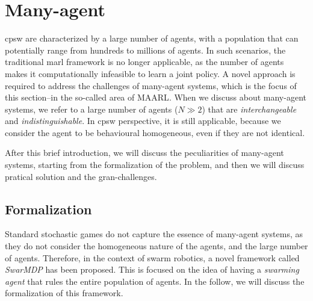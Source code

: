 \section{Many-agent}
\ac{cpsw} are characterized by a large number of agents, 
 with a population that can potentially range from hundreds to millions of agents.
%
In such scenarios, 
 the traditional \ac{marl} framework is no longer applicable, 
 as the number of agents makes it computationally infeasible to learn a joint policy.
%
A novel approach is required to address the challenges of many-agent systems, 
 which is the focus of this section--in the so-called area of \ac{MAARL}.
%
When we discuss about many-agent systems, 
 we refer to a large number of agents ($N \gg 2$) that are \emph{interchangeable} and \emph{indistinguishable}.
%
In \ac{cpsw} perspective, 
 it is still applicable, because we consider the agent to be behavioural homogeneous, 
 even if they are not identical.

After this brief introduction, 
 we will discuss the peculiarities of many-agent systems,
 starting from the formalization of the problem,
  and then we will discuss pratical solution and the gran-challenges.
\subsection{Formalization}
Standard stochastic games do not capture the essence of many-agent systems, 
 as they do not consider the homogeneous nature of the agents, and the large number of agents.
Therefore, in the context of swarm robotics, 
 a novel framework called \emph{SwarMDP} has been proposed.
 This is focused on the idea of having a \emph{swarming agent} that rules the entire population of agents.
 In the follow, we will discuss the formalization of this framework.
